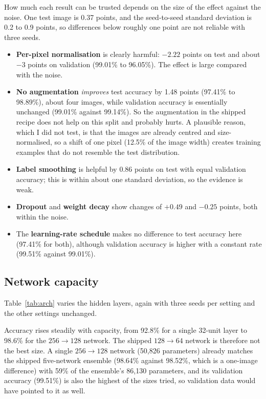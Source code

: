 \documentclass[11pt,a4paper]{article}
\begin{document}
How much each result can be trusted depends on the size of the effect against the noise. One test image is 0.37 points, and the seed-to-seed standard deviation is 0.2 to 0.9 points, so differences below roughly one point are not reliable with three seeds.
\begin{itemize}
  \item \textbf{Per-pixel normalisation} is clearly harmful: $-2.22$ points on test and about $-3$ points on validation (99.01\% to 96.05\%). The effect is large compared with the noise.
  \item \textbf{No augmentation} \emph{improves} test accuracy by 1.48 points (97.41\% to 98.89\%), about four images, while validation accuracy is essentially unchanged (99.01\% against 99.14\%). So the augmentation in the shipped recipe does not help on this split and probably hurts. A plausible reason, which I did not test, is that the images are already centred and size-normalised, so a shift of one pixel (12.5\% of the image width) creates training examples that do not resemble the test distribution.
  \item \textbf{Label smoothing} is helpful by 0.86 points on test with equal validation accuracy; this is within about one standard deviation, so the evidence is weak.
  \item \textbf{Dropout} and \textbf{weight decay} show changes of $+0.49$ and $-0.25$ points, both within the noise.
  \item The \textbf{learning-rate schedule} makes no difference to test accuracy here (97.41\% for both), although validation accuracy is higher with a constant rate (99.51\% against 99.01\%).
\end{itemize}

\subsection{Network capacity}
Table~\ref{tab:arch} varies the hidden layers, again with three seeds per setting and the other settings unchanged.

\begin{table}[H]
\centering
\small

\caption{Effect of network size on single-network accuracy (mean $\pm$ standard deviation over three seeds).}
\label{tab:arch}
\end{table}

Accuracy rises steadily with capacity, from 92.8\% for a single 32-unit layer to 98.6\% for the $256\to128$ network. The shipped $128\to64$ network is therefore not the best size. A single $256\to128$ network (50{,}826 parameters) already matches the shipped five-network ensemble (98.64\% against 98.52\%, which is a one-image difference) with 59\% of the ensemble's 86{,}130 parameters, and its validation accuracy (99.51\%) is also the highest of the sizes tried, so validation data would have pointed to it as well.
\end{document}
